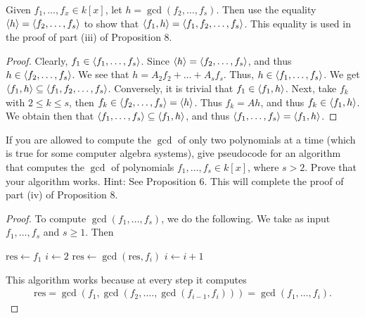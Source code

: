 \begin{exercise}{6}
Given $f_1,\dots,f_x\in k[x]$, let $h=\gcd(f_2,\dots,f_s)$. 
Then use the equality $\langle h\rangle = \langle f_2,\dots,f_s\rangle$ to show that $\langle f_1,h\rangle = \langle f_1,f_2,\dots,f_s\rangle$. 
This equality is used in the proof of part (iii) of Proposition 8.
\end{exercise}
\begin{proof}
Clearly, $f_1\in \langle f_1,\dots,f_s\rangle$. 
Since $\langle h\rangle = \langle f_2,\dots,f_s\rangle$, and thus $h\in \langle f_2,\dots,f_s\rangle$. 
We see that $h = A_2 f_2 + \dots + A_s f_s$. 
Thus, $h\in \langle f_1,\dots,f_s\rangle$. 
We get $\langle f_1,h\rangle\subseteq \langle f_1,f_2,\dots,f_s\rangle$. 
Conversely, it is trivial that $f_1\in \langle f_1,h\rangle$. 
Next, take $f_k$ with $2\leq k\leq s$, then $f_k\in \langle f_2,\dots,f_s\rangle = \langle h\rangle$. 
Thus $f_k = Ah$, and thus $f_k\in\langle f_1,h\rangle$. 
We obtain then that $\langle f_1,\dots,f_s\rangle \subseteq \langle f_1,h\rangle$, and thus $\langle f_1,\dots,f_s\rangle = \langle f_1,h\rangle$.
\end{proof}

\begin{exercise}{7}
If you are allowed to compute the $\gcd$ of only two polynomials at a time (which is true for some computer algebra systems), give pseudocode for an algorithm that computes the $\gcd$ of polynomials $f_1,\dots,f_s\in k[x]$, where $s>2$. 
Prove that your algorithm works. 
Hint: See Proposition 6. 
This will complete the proof of part (iv) of Proposition 8.
\end{exercise}
\begin{proof}
To compute $\gcd(f_1,\dots,f_s)$, we do the following. 
We take as input $f_1,\dots,f_s$ and $s\geq 1$. 
Then
\begin{center}
\begin{algorithmic}
\STATE $\text{res}\gets f_1$
\STATE $i\gets 2$
    \STATE $\text{res}\gets \gcd(\text{res}, f_i)$
    \STATE $i\gets i+1$
\ENDWHILE
\end{algorithmic}
\end{center}
This algorithm works because at every step it computes
\begin{align*}
    \text{res} = \gcd(f_1,\gcd(f_2,\dots.,\gcd(f_{i-1},f_i))) = \gcd(f_1,\dots,f_i).
\end{align*}
\end{proof}


